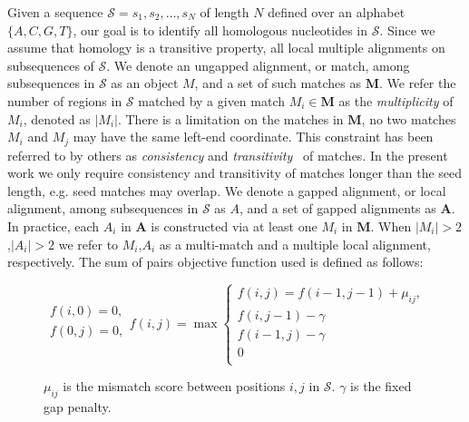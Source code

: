 \documentclass{ws-procs9x6}
\begin{document}
Given a sequence $\mathcal{S}=s_1, s_2,\dots, s_N$ of length $N$
defined over an alphabet $\{A,C,G,T\}$, our goal is to identify all homologous nucleotides in $\mathcal{S}$.
Since we assume that homology is a transitive property, all
local multiple alignments on subsequences of $\mathcal{S}$. We denote
an ungapped alignment, or match, among subsequences in $\mathcal{S}$
as an object $M$, and a set of such matches as $\mathbf{M}$.
We refer the number of regions in $\mathcal{S}$
matched by a given match $M_i \in \mathbf{M}$ as the
\textit{multiplicity} of $M_i$, denoted as $|M_i|$. There is a limitation on the matches in
$\mathbf{M}$, no two matches $M_i$ and $M_j$ may have the same
left-end coordinate.  This constraint has been referred to by others as \textit{consistency} and
\textit{transitivity}~\cite{ref-transitivity} of matches.  In the
present work we only require consistency and transitivity of matches
longer than the seed length, e.g. seed matches may overlap. We denote a gapped alignment, or local alignment, among subsequences in $\mathcal{S}$ as $A$, and a set of gapped alignments as $\mathbf{A}$.  In practice, each $A_i$ in $\mathbf{A}$ is constructed via
at least one $M_i$ in $\mathbf{M}$. When $|M_i|>2$,$|A_i|>2$ we refer to $M_i$,$A_i$ as
a multi-match and a multiple local alignment, respectively. The sum of pairs objective function used is defined as follows:\\
\begin{figure}[h!]
$$
\begin{array}{l}
f(i,0) = 0,\\
f(0,j) = 0,\\
\end{array}
f(i,j)= \max\left\{\begin{array}{l}
f(i,j) = f(i-1,j-1)+\mu_{ij},\\
f(i,j-1) - \gamma\\
f(i-1,j)-\gamma\\
0 \\
\end{array}\right.
$$
\begin{center}
$\mu_{ij}$ is the mismatch score between positions $i,j$ in $\mathcal{S}$.  $\gamma$ is the fixed gap penalty.

\end{center}

\label{ref-sop}
\end{figure}
\end{document}
